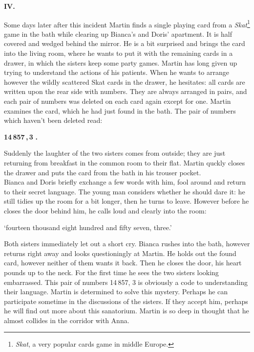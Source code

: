 \begin{center} 
{\bf IV.} 
\end{center} 
Some days later after this incident Martin finds a single playing card from a 
{\em Skat\/}\footnote {{\em Skat\/}, a very popular cards game in middle Europe.} 
game in the bath while clearing up Bianca's and Doris' apartment. 
It is half covered and wedged behind the mirror. 
He is a bit surprised and brings the card into the living room, where he wants to 
put it with the remaining cards in a drawer, in which the sisters keep some party games. 
Martin has long given up trying to understand the actions of his patients. 
When he wants to arrange however the wildly scattered Skat cards in the drawer, he 
hesitates: all cards are written upon the rear side with numbers. 
They are always arranged in pairs, and each pair of numbers was deleted on each card 
again except for one. 
Martin examines the card, which he had just found in the bath. 
The pair of numbers which haven't been deleted read:
\begin{center} 
{\bf 14\,857\,,\,3\,\,.} 
\end{center} 
Suddenly the laughter of the two sisters comes from outside; they are just returning 
from breakfast in the common room to their flat. 
Martin quckly closes the drawer and puts the card from the bath in his trouser 
pocket. \\
Bianca and Doris briefly exchange a few words with him, fool around and return to 
their secret language. 
The young man considers whether he should dare it: he still tidies up the room for 
a bit longer, then he turns to leave. 
However before he closes the door behind him, he calls loud and clearly into the 
room: 
\begin{center} 
`fourteen thousand eight hundred and fifty seven, three.' 
\end{center} 
Both sisters immediately let out a short cry. 
Bianca rushes into the bath, however returns right away and looks questioningly at 
Martin. 
He holds out the found card, however neither of them wants it back. 
Then he closes the door, his heart pounds up to the neck. 
For the first time he sees the two sisters looking embarrassed. 
This pair of numbers 14\,857,\,\,3 is obviously a code to understanding their language. 
Martin is determined to solve this mystery. 
Perhaps he can participate sometime in the discussions of the sisters. 
If they accept him, perhaps he will find out more about this sanatorium.
Martin is so deep in thought that he almost collides in the corridor with Anna. 
